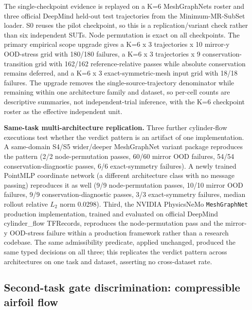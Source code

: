 \documentclass[preprint,12pt,authoryear]{elsarticle}
\begin{document}
The single-checkpoint evidence is replayed on a K=6 MeshGraphNets roster and three official DeepMind held-out test trajectories from the Minimum-MR-SubSet loader. S0 reuses the pilot checkpoint, so this is a replication/variant check rather than six independent SUTs. Node permutation is exact on all checkpoints. The primary empirical scope upgrade gives a K=6 x 3 trajectories x 10 mirror-y OOD-stress grid with 180/180 failures, a K=6 x 3 trajectories x 9 conservation-transition grid with 162/162 reference-relative passes while absolute conservation remains deferred, and a K=6 x 3 exact-symmetric-mesh input grid with 18/18 failures. The upgrade removes the single-source-trajectory denominator while remaining within one architecture family and dataset, so per-cell counts are descriptive summaries, not independent-trial inference, with the K=6 checkpoint roster as the effective independent unit.

\textbf{Same-task multi-architecture replication.} Three further cylinder-flow executions test whether the verdict pattern is an artifact of one implementation. A same-domain S4/S5 wider/deeper MeshGraphNet variant package reproduces the pattern (2/2 node-permutation passes, 60/60 mirror OOD failures, 54/54 conservation-diagnostic passes, 6/6 exact-symmetry failures). A newly trained PointMLP coordinate network (a different architecture class with no message passing) reproduces it as well (9/9 node-permutation passes, 10/10 mirror OOD failures, 9/9 conservation-diagnostic passes, 3/3 exact-symmetry failures, median rollout relative \(L_2\) norm 0.0298). Third, the NVIDIA PhysicsNeMo \texttt{MeshGraphNet} production implementation, trained and evaluated on official DeepMind cylinder\_flow TFRecords, reproduces the node-permutation pass and the mirror-y OOD-stress failure within a production framework rather than a research codebase. The same admissibility predicate, applied unchanged, produced the same typed decisions on all three; this replicates the verdict pattern across architectures on one task and dataset, asserting no cross-dataset rate.

\subsection{Second-task gate discrimination: compressible airfoil flow}
\label{subsec:second-task}
\end{document}
